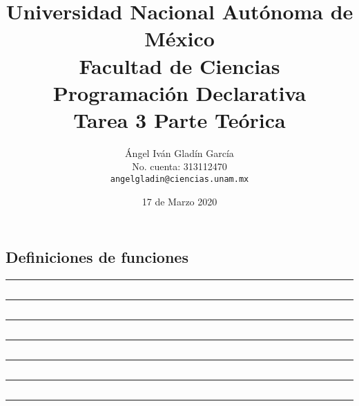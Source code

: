 \documentclass[11pt,letterpaper]{article}
\begin{document}
\title{
        Universidad Nacional Autónoma de México\\
        Facultad de Ciencias\\
        Programación Declarativa\\
    \vspace{.5cm}
    \large
        \textbf{Tarea 3} Parte Teórica
}
\author{
    Ángel Iván Gladín García\\
    No. cuenta: 313112470\\
    \texttt{angelgladin@ciencias.unam.mx}
}
\date{17 de Marzo 2020}
\maketitle




\subsection*{Definiciones de funciones}

\noindent
{\color{WildStrawberry} \rule{\linewidth}{0.4mm} }

\inputminted{haskell}{assets/def-map.hs}

\noindent
{\color{WildStrawberry} \rule{\linewidth}{0.4mm} }

\inputminted{haskell}{assets/def-flip.hs}

\noindent
{\color{WildStrawberry} \rule{\linewidth}{0.4mm} }

\inputminted{haskell}{assets/def-concat.hs}

\noindent
{\color{WildStrawberry} \rule{\linewidth}{0.4mm} }

\inputminted{haskell}{assets/def-foldr.hs}

\noindent
{\color{WildStrawberry} \rule{\linewidth}{0.4mm} }

\inputminted{haskell}{assets/def-foldl.hs}

\noindent
{\color{WildStrawberry} \rule{\linewidth}{0.4mm} }

\inputminted{haskell}{assets/def-reverse.hs}

\noindent
{\color{WildStrawberry} \rule{\linewidth}{0.4mm} }
\end{document}
